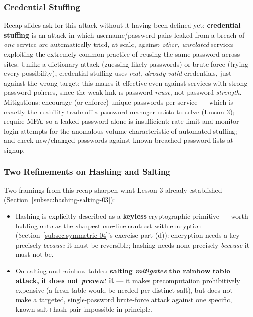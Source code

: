 \documentclass[12pt, a4paper]{article}
\begin{document}
\subsubsection{Credential Stuffing}
Recap slides ask for this attack without it having been defined yet: \textbf{credential stuffing} is an attack in which username/password pairs leaked from a breach of \emph{one} service are automatically tried, at scale, against \emph{other, unrelated} services --- exploiting the extremely common practice of reusing the same password across sites. Unlike a dictionary attack (guessing likely passwords) or brute force (trying every possibility), credential stuffing uses \emph{real, already-valid} credentials, just against the wrong target; this makes it effective even against services with strong password policies, since the weak link is password \emph{reuse}, not password \emph{strength}. Mitigations: encourage (or enforce) unique passwords per service --- which is exactly the usability trade-off a password manager exists to solve (Lesson 3); require MFA, so a leaked password alone is insufficient; rate-limit and monitor login attempts for the anomalous volume characteristic of automated stuffing; and check new/changed passwords against known-breached-password lists at signup.

\subsubsection{Two Refinements on Hashing and Salting}
Two framings from this recap sharpen what Lesson 3 already established (Section~\ref{subsec:hashing-salting-03}):
\begin{itemize}
    \item Hashing is explicitly described as a \textbf{keyless} cryptographic primitive --- worth holding onto as the sharpest one-line contrast with encryption (Section~\ref{subsec:symmetric-04}'s exercise part (d)): encryption needs a key precisely \emph{because} it must be reversible; hashing needs none precisely \emph{because} it must not be.
    \item On salting and rainbow tables: \textcolor{red!70!black}{\textbf{salting \emph{mitigates} the rainbow-table attack, it does not \emph{prevent} it}} --- it makes precomputation prohibitively expensive (a fresh table would be needed per distinct salt), but does not make a targeted, single-password brute-force attack against one specific, known salt+hash pair impossible in principle.
\end{itemize}
\end{document}
